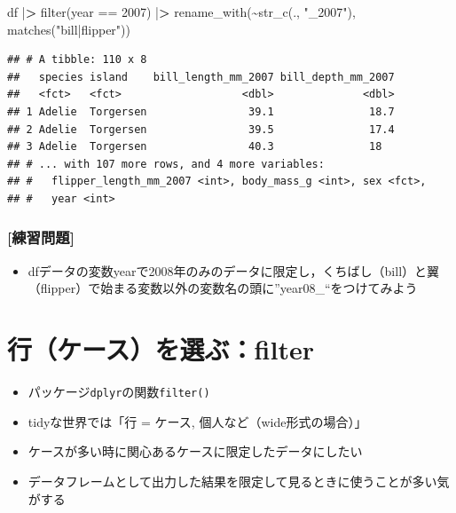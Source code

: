 \documentclass[
  xelatex,ja=standard, b5paper]{bxjsbook}
\newenvironment{Shaded}{\begin{snugshade}}{\end{snugshade}}
\newcommand{\DecValTok}[1]{\textcolor[rgb]{0.00,0.00,0.81}{#1}}
\newcommand{\ErrorTok}[1]{\textcolor[rgb]{0.64,0.00,0.00}{\textbf{#1}}}
\newcommand{\FunctionTok}[1]{\textcolor[rgb]{0.00,0.00,0.00}{#1}}
\newcommand{\NormalTok}[1]{#1}
\newcommand{\SpecialCharTok}[1]{\textcolor[rgb]{0.00,0.00,0.00}{#1}}
\newcommand{\StringTok}[1]{\textcolor[rgb]{0.31,0.60,0.02}{#1}}
\providecommand{\tightlist}{%
  \setlength{\itemsep}{0pt}\setlength{\parskip}{0pt}}
\begin{document}
\begin{Shaded}
\begin{Highlighting}[]
\NormalTok{df }\SpecialCharTok{|}\ErrorTok{\textgreater{}} 
\FunctionTok{filter}\NormalTok{(year }\SpecialCharTok{==} \DecValTok{2007}\NormalTok{) }\SpecialCharTok{|}\ErrorTok{\textgreater{}} 
  \FunctionTok{rename\_with}\NormalTok{(}\SpecialCharTok{\textasciitilde{}}\FunctionTok{str\_c}\NormalTok{(., }\StringTok{"\_2007"}\NormalTok{),}
               \FunctionTok{matches}\NormalTok{(}\StringTok{"bill|flipper"}\NormalTok{))}
\end{Highlighting}
\end{Shaded}

\begin{verbatim}
## # A tibble: 110 x 8
##   species island    bill_length_mm_2007 bill_depth_mm_2007
##   <fct>   <fct>                   <dbl>              <dbl>
## 1 Adelie  Torgersen                39.1               18.7
## 2 Adelie  Torgersen                39.5               17.4
## 3 Adelie  Torgersen                40.3               18  
## # ... with 107 more rows, and 4 more variables:
## #   flipper_length_mm_2007 <int>, body_mass_g <int>, sex <fct>,
## #   year <int>
\end{verbatim}

\hypertarget{ux7df4ux7fd2ux554fux984c-5}{%
\subsection{{[}練習問題{]}}\label{ux7df4ux7fd2ux554fux984c-5}}

\begin{itemize}
\tightlist
\item
  dfデータの変数yearで2008年のみのデータに限定し，くちばし（bill）と翼（flipper）で始まる変数以外の変数名の頭に''year08\_``をつけてみよう
\end{itemize}

\hypertarget{filter}{%
\chapter{行（ケース）を選ぶ：filter}\label{filter}}

\begin{itemize}
\tightlist
\item
  パッケージ\texttt{dplyr}の関数\texttt{filter()}
\item
  tidyな世界では「行 = ケース, 個人など（wide形式の場合）」
\item
  ケースが多い時に関心あるケースに限定したデータにしたい
\item
  データフレームとして出力した結果を限定して見るときに使うことが多い気がする
\end{itemize}
\end{document}
